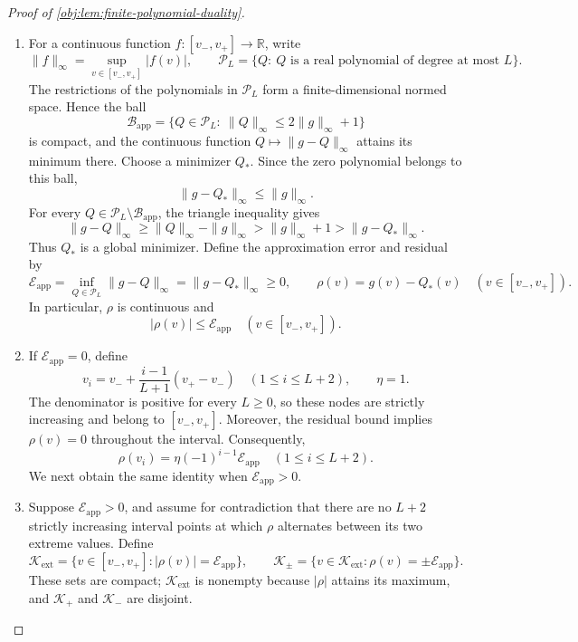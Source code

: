 \documentclass[11pt]{article}
\begin{document}
\begin{proof}[Proof of \cref{obj:lem:finite-polynomial-duality}]
\begin{enumerate}
\item For a continuous function \(f:[v_-,v_+]\to\mathbb R\), write
\[
\|f\|_\infty=\sup_{v\in[v_-,v_+]}|f(v)|,
\qquad
\mathscr P_L=\{Q:\ Q\text{ is a real polynomial of degree at most }L\}.
\]
The restrictions of the polynomials in \(\mathscr P_L\) form a finite-dimensional normed space. Hence the ball
\[
\mathscr B_{\mathrm{app}}
=
\{Q\in\mathscr P_L:\ \|Q\|_\infty\le 2\|g\|_\infty+1\}
\]
is compact, and the continuous function \(Q\mapsto\|g-Q\|_\infty\) attains its minimum there. Choose a minimizer \(Q_*\). Since the zero polynomial belongs to this ball,
\[
\|g-Q_*\|_\infty\le \|g\|_\infty.
\]
For every \(Q\in\mathscr P_L\setminus\mathscr B_{\mathrm{app}}\), the triangle inequality gives
\[
\|g-Q\|_\infty
\ge \|Q\|_\infty-\|g\|_\infty
> \|g\|_\infty+1
> \|g-Q_*\|_\infty.
\]
Thus \(Q_*\) is a global minimizer. Define the approximation error and residual by
\[
\mathcal E_{\mathrm{app}}
=
\inf_{Q\in\mathscr P_L}\|g-Q\|_\infty
=
\|g-Q_*\|_\infty\ge0,
\qquad
\rho(v)=g(v)-Q_*(v)
\quad(v\in[v_-,v_+]).
\]
In particular, \(\rho\) is continuous and
\[
|\rho(v)|\le\mathcal E_{\mathrm{app}}
\quad(v\in[v_-,v_+]).
\]

\item If \(\mathcal E_{\mathrm{app}}=0\), define
\[
v_i=v_-+\frac{i-1}{L+1}(v_+-v_-)
\quad(1\le i\le L+2),
\qquad
\eta=1.
\]
The denominator is positive for every \(L\ge0\), so these nodes are strictly increasing and belong to \([v_-,v_+]\). Moreover, the residual bound implies \(\rho(v)=0\) throughout the interval. Consequently,
\[
\rho(v_i)=\eta(-1)^{i-1}\mathcal E_{\mathrm{app}}
\quad(1\le i\le L+2).
\]
We next obtain the same identity when \(\mathcal E_{\mathrm{app}}>0\).

\item Suppose \(\mathcal E_{\mathrm{app}}>0\), and assume for contradiction that there are no \(L+2\) strictly increasing interval points at which \(\rho\) alternates between its two extreme values. Define
\[
\mathcal K_{\mathrm{ext}}
=
\{v\in[v_-,v_+]:|\rho(v)|=\mathcal E_{\mathrm{app}}\},
\qquad
\mathcal K_\pm
=
\{v\in\mathcal K_{\mathrm{ext}}:
\rho(v)=\pm\mathcal E_{\mathrm{app}}\}.
\]
These sets are compact; \(\mathcal K_{\mathrm{ext}}\) is nonempty because \(|\rho|\) attains its maximum, and \(\mathcal K_+\) and \(\mathcal K_-\) are disjoint.


\end{enumerate}
\end{proof}
\end{document}
